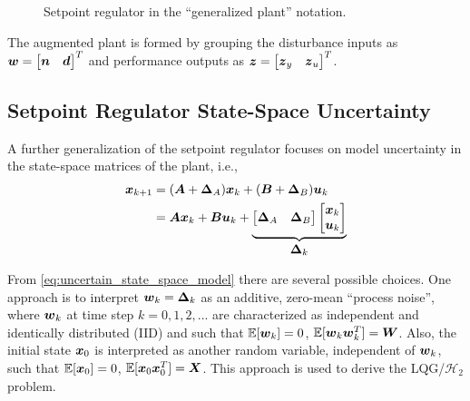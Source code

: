 \begin{figure}[H]
{
}
\caption{Setpoint regulator in the ``generalized plant'' notation.}
\label{fig:regulator_generalized}
\end{figure}

The augmented plant is formed by grouping the disturbance inputs as $\vb*{w} = \begin{bmatrix} \vb*{n} & \vb*{d} \end{bmatrix}^{T}$ and performance outputs as $\vb*{z} = \begin{bmatrix} \vb*{z}_{y} & \vb*{z}_{u} \end{bmatrix}^{T}$.

\subsection{Setpoint Regulator State-Space Uncertainty}
A further generalization of the setpoint regulator focuses on model uncertainty in the state-space matrices of the plant, i.e.,
\begin{equation}
\label{eq:uncertain_state_space_model}
\begin{aligned}
	\vb*{x}_{k+1} &= (\vb*{A} + \vb*{\Delta}_{A})\vb*{x}_{k} + (\vb*{B} + \vb*{\Delta}_{B})\vb*{u}_{k}\\
		&= \vb*{A}\vb*{x}_{k} + \vb*{B}\vb*{u}_{k} + 
		\underbrace{\begin{bmatrix} \vb*{\Delta}_{A} & \vb*{\Delta}_{B} \end{bmatrix}
			\begin{bmatrix} \vb*{x}_{k} \\ \vb*{u}_{k} \end{bmatrix}}_{\text{\normalsize $\vb*{\Delta}_{k}$}}
\end{aligned}
\end{equation}

From \eqref{eq:uncertain_state_space_model} there are several possible choices.  One approach is to interpret $\vb*{w}_{k} = \vb*{\Delta}_{k}$ as an additive, zero-mean ``process noise'', where $\vb*{w}_{k}$ at time step $k = 0,1,2,...$ are characterized as independent and identically distributed (IID) and such that $\mathbb{E}[\vb*{w}_{k}] = 0$, $\mathbb{E}[\vb*{w}_{k}\vb*{w}_{k}^{T}] = \vb*{W}$.  Also, the initial state $\vb*{x}_{0}$ is interpreted as another random variable, independent of $\vb*{w}_{k}$, such that $\mathbb{E}[\vb*{x}_{0}] = 0$, $\mathbb{E}[\vb*{x}_{0}\vb*{x}_{0}^{T}] = \vb*{X}$.  This approach is used to derive the LQG/$\mathcal{H}_{2}$ problem.

